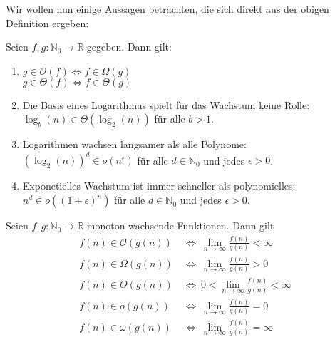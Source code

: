 Wir wollen nun einige Aussagen betrachten, die sich direkt aus der obigen Definition ergeben:
\begin{lemma} Seien $f, g : \mathbb{N}_0 \rightarrow \mathbb{R}$ gegeben. Dann gilt:
	\begin{enumerate}[label=(\roman*)]
		\item $g \in \mathcal{O}(f) \Leftrightarrow f \in \Omega(g)$ \\
		      $g \in \Theta(f) \Leftrightarrow f \in \Theta(g)$

		\item Die Basis eines Logarithmus spielt für das Wachstum keine Rolle: \\
		      $\log_b(n) \in \Theta(\log_2(n))$ für alle $b > 1$.

		\item Logarithmen wachsen langsamer als alle Polynome: \\
		      $(\log_2(n))^d \in o(n^{\epsilon})$ für alle $d \in \mathbb{N}_0$ und jedes $\epsilon > 0$.

		\item Exponetielles Wachstum ist immer schneller als polynomielles: \\
		      $n^d \in o((1+\epsilon)^n)$ für alle $d \in \mathbb{N}_0$ und jedes $\epsilon > 0$.
	\end{enumerate}
\end{lemma}


\begin{proposition} Seien $f,g : \mathbb{N}_0 \rightarrow \mathbb{R}$ monoton wachsende Funktionen. Dann gilt
	\begin{align*}
		f(n) \in \mathcal{O}(g(n)) \  & \Leftrightarrow \ \lim\limits_{n \rightarrow \infty}{\frac{f(n)}{g(n)}} < \infty     \\
		f(n) \in \Omega(g(n)) \       & \Leftrightarrow \ \lim\limits_{n \rightarrow \infty}{\frac{f(n)}{g(n)}} > 0          \\
		f(n) \in \Theta(g(n)) \       & \Leftrightarrow \ 0 < \lim\limits_{n \rightarrow \infty}{\frac{f(n)}{g(n)}} < \infty \\
		f(n) \in o(g(n)) \            & \Leftrightarrow \ \lim\limits_{n \rightarrow \infty}{\frac{f(n)}{g(n)}} = 0          \\
		f(n) \in \omega(g(n)) \       & \Leftrightarrow \ \lim\limits_{n \rightarrow \infty}{\frac{f(n)}{g(n)}} = \infty
	\end{align*}
\end{proposition}

